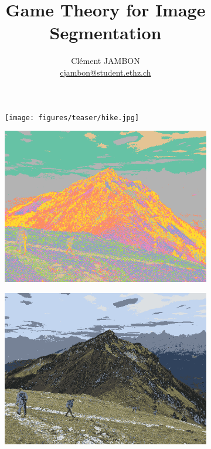 \documentclass[11pt,a4paper]{article}
\begin{document}
\title{Game Theory for Image Segmentation}
\author{Clément JAMBON \\ \href{mailto:cjambon@student.ethz.ch}{cjambon@student.ethz.ch}}
\maketitle

\begin{figure}[H]
    \centering
    \begin{subfigure}[b]{0.3\textwidth}
        \centering
        \texttt{[image: figures/teaser/hike.jpg]}
        \caption{ }
    \end{subfigure}
    \hfill
    \begin{subfigure}[b]{0.3\textwidth}
        \centering
        \includegraphics[width=\textwidth]{figures/teaser/hike_seg.png}
        \caption{ }
    \end{subfigure}
    \hfill
    \begin{subfigure}[b]{0.3\textwidth}
        \centering
        \includegraphics[width=\textwidth]{figures/teaser/hike_avg.png}

\end{subfigure}
\end{figure}
\end{document}
